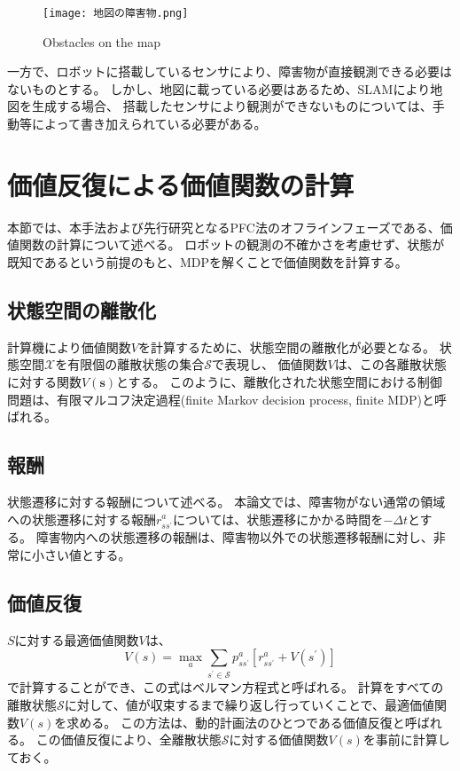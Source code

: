 \begin{figure}[H]
  \begin{center}
    \texttt{[image: 地図の障害物.png]}
    \caption{Obstacles on the map}
    \label{fig:地図の障害物}
  \end{center}
\end{figure}

一方で、ロボットに搭載しているセンサにより、障害物が直接観測できる必要はないものとする。
しかし、地図に載っている必要はあるため、SLAMにより地図を生成する場合、
搭載したセンサにより観測ができないものについては、手動等によって書き加えられている必要がある。


\section{価値反復による価値関数の計算} \label{section:価値関数}
本節では、本手法および先行研究となるPFC法のオフラインフェーズである、価値関数の計算について述べる。
ロボットの観測の不確かさを考慮せず、状態が既知であるという前提のもと、MDPを解くことで価値関数を計算する。

\subsection{状態空間の離散化}
計算機により価値関数$V$を計算するために、状態空間の離散化が必要となる。
状態空間$\mathcal{X}$を有限個の離散状態の集合$\mathcal{S}$で表現し、
価値関数$V$は、この各離散状態に対する関数$V(\bm{s})$とする。
このように、離散化された状態空間における制御問題は、有限マルコフ決定過程(finite Markov decision process, finite MDP)と呼ばれる。

\subsection{報酬} \label{subsection:報酬}
状態遷移に対する報酬について述べる。
本論文では、障害物がない通常の領域への状態遷移に対する報酬$r^{a}_{ss^{\prime}}$については、状態遷移にかかる時間を$-\Delta t$とする。
障害物内への状態遷移の報酬は、障害物以外での状態遷移報酬に対し、非常に小さい値とする。

\subsection{価値反復}
$S$に対する最適価値関数$V$は、
\begin{equation}
\label{bellman equation}
  V(s) = \max_{a} \sum_{s^{\prime} \in \mathcal{S}}
         p^{a}_{ss^{\prime}} \left[ r^{a}_{ss^{\prime}} + V(s^{\prime}) \right]
\end{equation}
で計算することができ、この式はベルマン方程式と呼ばれる。
計算をすべての離散状態$\mathcal{S}$に対して、値が収束するまで繰り返し行っていくことで、最適価値関数$V(s)$を求める。
この方法は、動的計画法のひとつである価値反復と呼ばれる。
この価値反復により、全離散状態$\mathcal{S}$に対する価値関数$V(s)$を事前に計算しておく。


